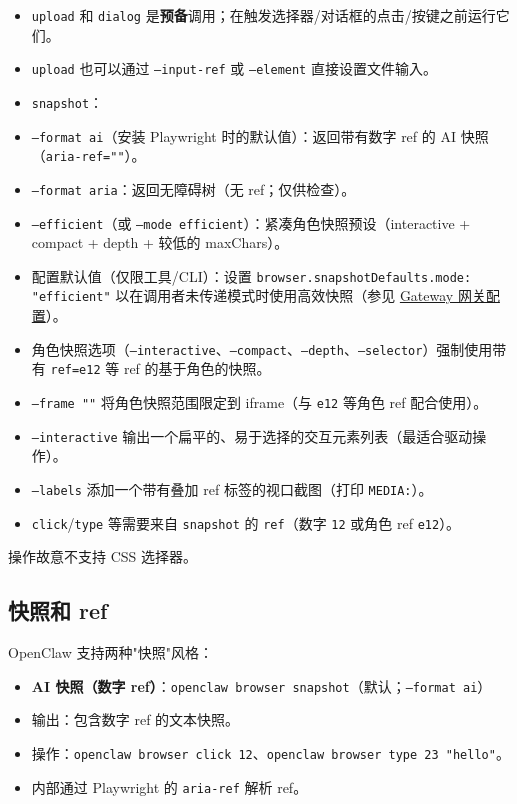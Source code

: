 \begin{itemize}
  \item \texttt{upload} 和 \texttt{dialog} 是\textbf{预备}调用；在触发选择器/对话框的点击/按键之前运行它们。
  \item \texttt{upload} 也可以通过 \texttt{--input-ref} 或 \texttt{--element} 直接设置文件输入。
  \item \texttt{snapshot}：
  \item \texttt{--format ai}（安装 Playwright 时的默认值）：返回带有数字 ref 的 AI 快照（\texttt{aria-ref=""}）。
  \item \texttt{--format aria}：返回无障碍树（无 ref；仅供检查）。
  \item \texttt{--efficient}（或 \texttt{--mode efficient}）：紧凑角色快照预设（interactive + compact + depth + 较低的 maxChars）。
  \item 配置默认值（仅限工具/CLI）：设置 \texttt{browser.snapshotDefaults.mode: "efficient"} 以在调用者未传递模式时使用高效快照（参见 \href{/gateway/configuration\#browser-openclaw-managed-browser}{Gateway 网关配置}）。
  \item 角色快照选项（\texttt{--interactive}、\texttt{--compact}、\texttt{--depth}、\texttt{--selector}）强制使用带有 \texttt{ref=e12} 等 ref 的基于角色的快照。
  \item \texttt{--frame ""} 将角色快照范围限定到 iframe（与 \texttt{e12} 等角色 ref 配合使用）。
  \item \texttt{--interactive} 输出一个扁平的、易于选择的交互元素列表（最适合驱动操作）。
  \item \texttt{--labels} 添加一个带有叠加 ref 标签的视口截图（打印 \texttt{MEDIA:}）。
  \item \texttt{click}/\texttt{type} 等需要来自 \texttt{snapshot} 的 \texttt{ref}（数字 \texttt{12} 或角色 ref \texttt{e12}）。
\end{itemize}

操作故意不支持 CSS 选择器。

\subsection{快照和 ref}


OpenClaw 支持两种"快照"风格：

\begin{itemize}
  \item \textbf{AI 快照（数字 ref）}：\texttt{openclaw browser snapshot}（默认；\texttt{--format ai}）
  \item 输出：包含数字 ref 的文本快照。
  \item 操作：\texttt{openclaw browser click 12}、\texttt{openclaw browser type 23 "hello"}。
  \item 内部通过 Playwright 的 \texttt{aria-ref} 解析 ref。
\end{itemize}


